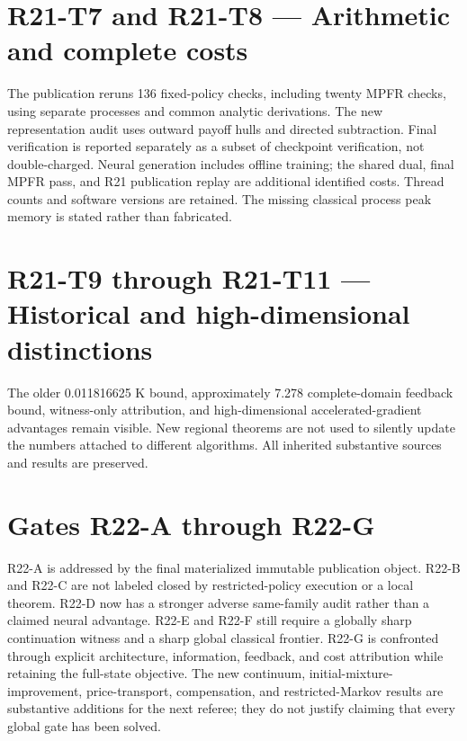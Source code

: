 \documentclass[ecta]{econsocart}
\theoremstyle{remark}
\begin{document}
\section{R21-T7 and R21-T8 — Arithmetic and complete costs}
The publication reruns 136 fixed-policy checks, including twenty MPFR checks, using separate processes and common analytic derivations. The new representation audit uses outward payoff hulls and directed subtraction. Final verification is reported separately as a subset of checkpoint verification, not double-charged. Neural generation includes offline training; the shared dual, final MPFR pass, and R21 publication replay are additional identified costs. Thread counts and software versions are retained. The missing classical process peak memory is stated rather than fabricated.

\section{R21-T9 through R21-T11 — Historical and high-dimensional distinctions}
The older 0.011816625 K bound, approximately 7.278 complete-domain feedback bound, witness-only attribution, and high-dimensional accelerated-gradient advantages remain visible. New regional theorems are not used to silently update the numbers attached to different algorithms. All inherited substantive sources and results are preserved.

\section{Gates R22-A through R22-G}
R22-A is addressed by the final materialized immutable publication object. R22-B and R22-C are not labeled closed by restricted-policy execution or a local theorem. R22-D now has a stronger adverse same-family audit rather than a claimed neural advantage. R22-E and R22-F still require a globally sharp continuation witness and a sharp global classical frontier. R22-G is confronted through explicit architecture, information, feedback, and cost attribution while retaining the full-state objective. The new continuum, initial-mixture-improvement, price-transport, compensation, and restricted-Markov results are substantive additions for the next referee; they do not justify claiming that every global gate has been solved. 
\end{document}
